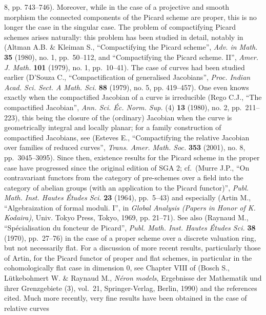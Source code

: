 \documentclass[
  11pt,
  a4paper,
]{book}
\begin{document}
\begin{enumerate}
{    8, pp. 743--746). Moreover, while in the case of a projective and
    smooth morphism the connected components of the Picard scheme are
    proper, this is no longer the case in the singular case. The problem
    of compactifying Picard schemes arises naturally: this problem has
    been studied in detail, notably in (Altman A.B. \& Kleiman S.,
    ``Compactifying the Picard scheme'', \emph{Adv. in Math.}
    \textbf{35} (1980), no. 1, pp.~50--112, and ``Compactifying the
    Picard scheme. II'', \emph{Amer. J. Math.} \textbf{101} (1979), no.
    1, pp.~10--41). The case of curves had been studied earlier (D'Souza
    C., ``Compactification of generalised Jacobians'', \emph{Proc.
    Indian Acad. Sci. Sect. A Math. Sci.} \textbf{88} (1979), no. 5, pp.
    419--457). One even knows exactly when the compactified Jacobian of
    a curve is irreducible (Rego C.J., ``The compactified Jacobian'',
    \emph{Ann. Sci. Éc. Norm. Sup.} (4) \textbf{13} (1980), no. 2,
    pp.~211--223), this being the closure of the (ordinary) Jacobian
    when the curve is geometrically integral and locally planar; for a
    family construction of compactified Jacobians, see (Esteves E.,
    ``Compactifying the relative Jacobian over families of reduced
    curves'', \emph{Trans. Amer. Math. Soc.} \textbf{353} (2001), no. 8,
    pp.~3045--3095). Since then, existence results for the Picard scheme
    in the proper case have progressed since the original edition of SGA
    2; cf.~(Murre J.P., ``On contravariant functors from the category of
    pre-schemes over a field into the category of abelian groups (with
    an application to the Picard functor)'', \emph{Publ. Math. Inst.
    Hautes Études Sci.} \textbf{23} (1964), pp.~5--43) and especially
    (Artin M., ``Algebraization of formal moduli. I'', in \emph{Global
    Analysis (Papers in Honor of K. Kodaira)}, Univ. Tokyo Press, Tokyo,
    1969, pp. 21--71). See also (Raynaud M., ``Spécialisation du
    foncteur de Picard'', \emph{Publ. Math. Inst. Hautes Études Sci.}
    \textbf{38} (1970), pp.~27--76) in the case of a proper scheme over
    a discrete valuation ring, but not necessarily flat. For a
    discussion of more recent results, particularly those of Artin, for
    the Picard functor of proper and flat schemes, in particular in the
    cohomologically flat case in dimension 0, see Chapter VIII of (Bosch
    S., Lütkebohmert W. \& Raynaud M., \emph{Néron models}, Ergebnisse
    der Mathematik und ihrer Grenzgebiete (3), vol.~21, Springer-Verlag,
    Berlin, 1990) and the references cited. Much more recently, very
    fine results have been obtained in the case of relative curves
}
\end{enumerate}
\end{document}
